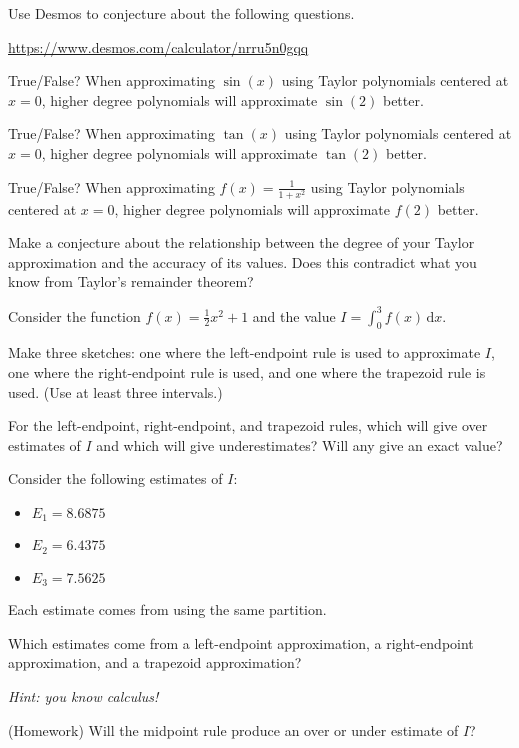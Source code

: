 \documentclass{workbook}
\begin{document}
\begin{slide}
	\question
	Use Desmos to conjecture about the following questions.

	\url{https://www.desmos.com/calculator/nrru5n0gqq}

	\begin{parts}
		\item True/False? When approximating $\sin(x)$ using Taylor polynomials centered at $x=0$, higher degree polynomials will approximate $\sin(2)$ better.
		\item True/False? When approximating $\tan(x)$ using Taylor polynomials centered at $x=0$, higher degree polynomials will approximate $\tan(2)$ better.

		\item True/False? When approximating $f(x)=\frac{1}{1+x^2}$ using Taylor polynomials centered at $x=0$, higher degree polynomials will approximate $f(2)$ better.

		\item Make a conjecture about the relationship between the degree of your Taylor approximation and the accuracy of its values. Does
		this contradict what you know from Taylor's remainder theorem?

	\end{parts}
\end{slide}


%
%
\begin{slide}
	\question
	Consider the function $f(x)=\frac{1}{2}x^2+1$ and the value $\displaystyle I=\int_{0}^3f(x)\,\mathrm d x$.

	\begin{parts}
		\item Make three sketches: one where the left-endpoint rule is used to approximate $I$, 
		one where the right-endpoint rule is used, 
		and one where the trapezoid rule is used. (Use at least three intervals.)

		\item For the left-endpoint, right-endpoint, and trapezoid rules, which will give over estimates of
		$I$ and which will give underestimates? Will any give an exact value?

		\medskip
		\item Consider the following estimates of $I$:
		\begin{itemize}
			\item $E_1=8.6875$
			\item $E_2=6.4375$
			\item $E_3=7.5625$
		\end{itemize}
		Each estimate comes from using the same partition.

		Which estimates come from a left-endpoint approximation, a right-endpoint approximation, 
		and a trapezoid approximation?

		\emph{Hint: you know calculus!}

		\item (Homework) Will the midpoint rule produce an over or under estimate of $I$?

	\end{parts}
\end{slide}
\end{document}
